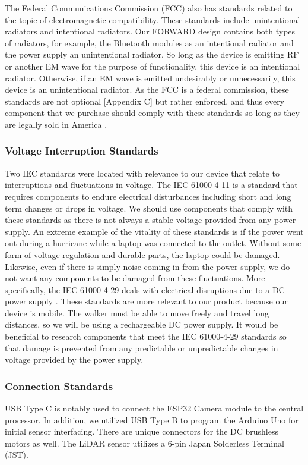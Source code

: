 \noindent The Federal Communications Commission (FCC) also has standards related to the topic of electromagnetic compatibility. These standards include unintentional radiators and intentional radiators. Our FORWARD design contains both types of radiators, for example, the Bluetooth modules as an intentional radiator and the power supply an unintentional radiator. So long as the device is emitting RF or another EM wave for the purpose of functionality, this device is an intentional radiator. Otherwise, if an EM wave is emitted undesirably or unnecessarily, this device is an unintentional radiator. As the FCC is a federal commission, these standards are not optional [Appendix C] but rather enforced, and thus every component that we purchase should comply with these standards so long as they are legally sold in America \cite{fcc_unintentional_radiators} \cite{fcc_intentional_radiators}.

\subsubsection{Voltage Interruption Standards}
\noindent Two IEC standards were located with relevance to our device that relate to interruptions and fluctuations in voltage. The IEC 61000-4-11\cite{iec_standard_2} is a standard that requires components to endure electrical disturbances including short and long term changes or drops in voltage. We should use components that comply with these standards as there is not always a stable voltage provided from any power supply. An extreme example of the vitality of these standards is if the power went out during a hurricane while a laptop was connected to the outlet. Without some form of voltage regulation and durable parts, the laptop could be damaged. Likewise, even if there is simply noise coming in from the power supply, we do not want any components to be damaged from these fluctuations. More specifically, the IEC 61000-4-29 deals with electrical disruptions due to a DC power supply \cite{iec_standard_3}. These standards are more relevant to our product because our device is mobile. The walker must be able to move freely and travel long distances, so we will be using a rechargeable DC power supply. It would be beneficial to research components that meet the IEC 61000-4-29 standards so that damage is prevented from any predictable or unpredictable changes in voltage provided by the power supply.\\

\subsubsection{Connection Standards}
\noindent USB Type C is notably used to connect the ESP32 Camera module to the central processor. In addition, we utilized USB Type B to program the Arduino Uno for initial sensor interfacing. There are unique connectors for the DC brushless motors as well. The LiDAR sensor utilizes a 6-pin Japan Solderless Terminal (JST).


